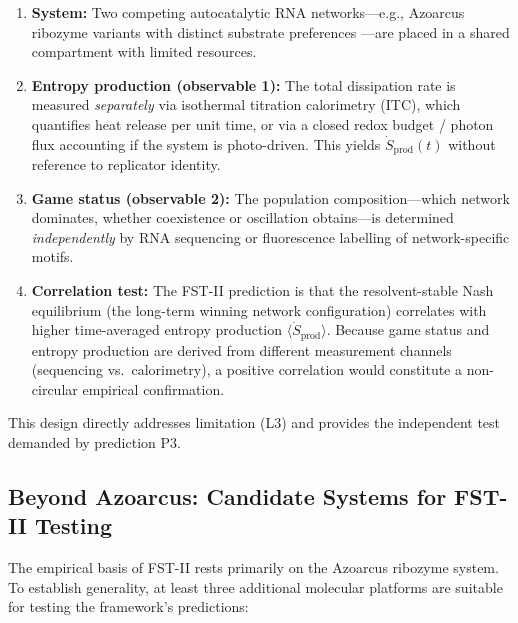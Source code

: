 \documentclass[12pt,a4paper]{article}
\theoremstyle{remark}
\begin{document}
\begin{enumerate}
    \item \textbf{System:} Two competing autocatalytic RNA networks---e.g., Azoarcus ribozyme variants with distinct substrate preferences \citep{AzoarcusPMC}---are placed in a shared compartment with limited resources.
    \item \textbf{Entropy production (observable 1):} The total dissipation rate is measured \emph{separately} via isothermal titration calorimetry (ITC), which quantifies heat release per unit time, or via a closed redox budget / photon flux accounting if the system is photo-driven. This yields $\dot{S}_{\mathrm{prod}}(t)$ without reference to replicator identity.
    \item \textbf{Game status (observable 2):} The population composition---which network dominates, whether coexistence or oscillation obtains---is determined \emph{independently} by RNA sequencing or fluorescence labelling of network-specific motifs.
    \item \textbf{Correlation test:} The FST-II prediction is that the resolvent-stable Nash equilibrium (the long-term winning network configuration) correlates with higher time-averaged entropy production $\langle\dot{S}_{\mathrm{prod}}\rangle$. Because game status and entropy production are derived from different measurement channels (sequencing vs.\ calorimetry), a positive correlation would constitute a non-circular empirical confirmation.
\end{enumerate}

\noindent
This design directly addresses limitation (L3) and provides the independent test demanded by prediction P3.

\subsection{Beyond Azoarcus: Candidate Systems for FST-II Testing}
\label{sec:beyond-azoarcus}

The empirical basis of FST-II rests primarily on the Azoarcus ribozyme system. To establish generality, at least three additional molecular platforms are suitable for testing the framework's predictions:
\end{document}
